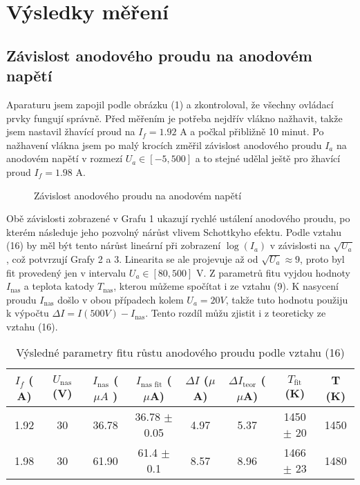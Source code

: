\documentclass[a4paper,11pt]{article}
\begin{document}
\newpage

\section{Výsledky měření}

\subsection{Závislost anodového proudu na anodovém napětí}

Aparaturu jsem zapojil podle obrázku (1) a zkontroloval, že všechny ovládací prvky fungují správně. Před měřením je potřeba nejdřív vlákno nažhavit, takže jsem nastavil žhavící proud na $ I_f = 1.92 $ A a počkal přibližně 10 minut. Po nažhavení vlákna jsem po malý krocích změřil závislost anodového proudu $ I_a $  na anodovém napětí v rozmezí $ U_a \in [-5, 500] $ a to stejné udělal ještě pro žhavící proud $ I_f = 1.98 $ A. 

\begin{figure}[h]
    \centering
    \resizebox{0.45\textwidth}{!}{  }
    \captionsetup{type=graph}
    \caption{ Závislost anodového proudu na anodovém napětí}
\end{figure}

Obě závislosti zobrazené v Grafu 1 ukazují rychlé ustálení anodového proudu, po kterém následuje jeho pozvolný nárůst vlivem Schottkyho efektu. Podle vztahu (16) by měl být tento nárůst lineární při zobrazení $ \log(I_a) $ v závislosti na $ \sqrt{U_a}  $, což potvrzují Grafy 2 a 3. Linearita se ale projevuje až od $\sqrt{U_a} \approx 9$, proto byl fit provedený jen v intervalu $U_a \in [80, 500]$ V. Z parametrů fitu vyjdou hodnoty $ I_{\text{nas}} $ a teplota katody $ T_{\text{nas}} $, kterou můžeme spočítat i ze vztahu (9). K nasycení proudu $ I_{\text{nas}} $  došlo v obou případech kolem $ U_a = 20 V $, takže tuto hodnotu použiju k výpočtu $ \Delta I = I(500 V) - I_{\text{nas}} $. Tento rozdíl můžu zjistit i z teoreticky ze vztahu (16).

\begin{table}[h]
    \centering
    \begin{tabular}{| c | c c c | c c | c c |}
        \hline
        $ I_f $ ($ $A) & $ U_{\text{nas}} $ (V) & $ I_\text{nas} $ ($ \mu A $ ) & $ I_{\text{nas fit}} $ ($  \mu$A) & $ \Delta I $   ($ \mu $ A) & $ \Delta I_{\text{teor}} $ ($ \mu  $A)  & $ T_{\text{fit}} $  (K) & T (K)  \\
        \hline
        1.92 & 30 & 36.78 &  36.78 $ \pm $ 0.05 & 4.97 & 5.37 & 1450 $ \pm $ 20 & 1450 \\
        1.98 & 30 & 61.90 & 61.4 $ \pm $ 0.1 & 8.57 & 8.96 & 1466 $ \pm $ 23 & 1480 \\
        \hline
    \end{tabular}
    \caption{ Výsledné parametry fitu růstu anodového proudu podle vztahu (16) }
\end{table}
\vspace{-40pt}
\end{document}

